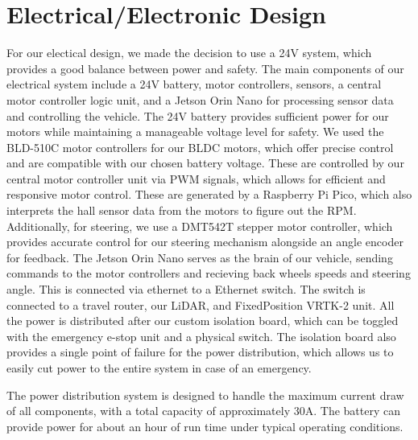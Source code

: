 \section{Electrical/Electronic Design}

For our electical design, we made the decision to use a 24V system, which provides a good balance between power and safety.
The main components of our electrical system include a 24V battery, motor controllers, sensors, a central motor controller logic unit, and a Jetson Orin Nano for processing sensor data and controlling the vehicle.
The 24V battery provides sufficient power for our motors while maintaining a manageable voltage level for safety.
We used the BLD-510C motor controllers for our BLDC motors, which offer precise control and are compatible with our chosen battery voltage.
These are controlled by our central motor controller unit via PWM signals, which allows for efficient and responsive motor control.
These are generated by a Raspberry Pi Pico, which also interprets the hall sensor data from the motors to figure out the RPM.
Additionally, for steering, we use a DMT542T stepper motor controller, which provides accurate control for our steering mechanism alongside an angle encoder for feedback.
The Jetson Orin Nano serves as the brain of our vehicle, sending commands to the motor controllers and recieving back wheels speeds and steering angle.
This is connected via ethernet to a Ethernet switch. The switch is connected to a travel router, our LiDAR, and FixedPosition VRTK-2 unit.
All the power is distributed after our custom isolation board, which can be toggled with the emergency e-stop unit and a physical switch. The isolation board also provides a single point of failure for the power distribution, which allows us to easily cut power to the entire system in case of an emergency.

The power distribution system is designed to handle the maximum current draw of all components, with a total capacity of approximately 30A. The battery can provide power for about an hour of run time under typical operating conditions.